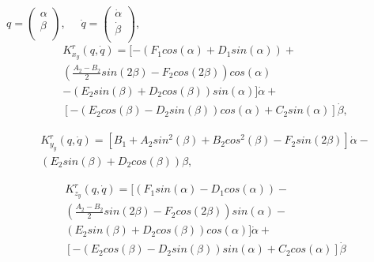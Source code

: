 \( q= \left( \begin{matrix}
\alpha \\
\beta \\
\end{matrix}
\right) \),\ \ \ \( \dot{q}= \left( \begin{matrix}
\dot{\alpha} \\
\dot{\beta} \\
\end{matrix}
\right) \), 
\begin{equation}
\begin{multlined}
K_{x_{y}}^{r} ( q,\dot{q} ) = 
[
	-( 
		F_{1}cos ( \alpha ) +
		D_{1}sin ( \alpha ) 
	) + \nonumber \\
	( 
		\frac{A_{2}-B_{2}}{2}sin ( 2 \beta ) -
		F_{2}cos ( 2 \beta ) 
	) cos ( \alpha ) \nonumber \\
	- ( 
		E_{2}sin ( \beta ) +
		D_{2}cos ( \beta ) 
	) sin ( \alpha ) 
] \dot{\alpha} + \nonumber \\
[
	- ( 
		E_{2}cos ( \beta ) -
		D_{2}sin ( \beta ) 
	) cos ( \alpha ) +
	C_{2}sin ( \alpha ) 
] \dot{\beta}	,\nonumber
\end{multlined}
\end{equation}

\begin{equation}
\begin{multlined}
 K_{y_{y}}^{r} \left( q,\dot{q} \right) = 
 [ B_{1}+A_{2}sin^{2} ( \beta ) +B_{2}cos^{2} ( \beta ) -F_{2}sin ( 2 \beta ) ] \dot{\alpha} - \nonumber \\
 ( E_{2}sin ( \beta ) +D_{2}cos ( \beta ) ) \beta, \nonumber
\end{multlined}
\end{equation}

\begin{equation}
\begin{multlined}
K_{z_{y}}^{r} \left( q,\dot{q} \right) = 
[ 
	\left( F_{1}sin ( \alpha ) -D_{1}cos ( \alpha ) \right) - \nonumber \\
	\left( \frac{A_{2}-B_{2}}{2}sin ( 2 \beta ) -F_{2}cos ( 2 \beta ) \right) sin ( \alpha ) - \nonumber \\
	\left( E_{2}sin ( \beta ) +D_{2}cos ( \beta ) \right) cos ( \alpha )
]
\dot{\alpha} + \nonumber \\
[ 
	- \left( E_{2}cos ( \beta ) -D_{2}sin ( \beta ) \right) sin ( \alpha ) +C_{2}cos ( \alpha ) 
] 
\dot{\beta} \nonumber
\end{multlined}
\end{equation}

